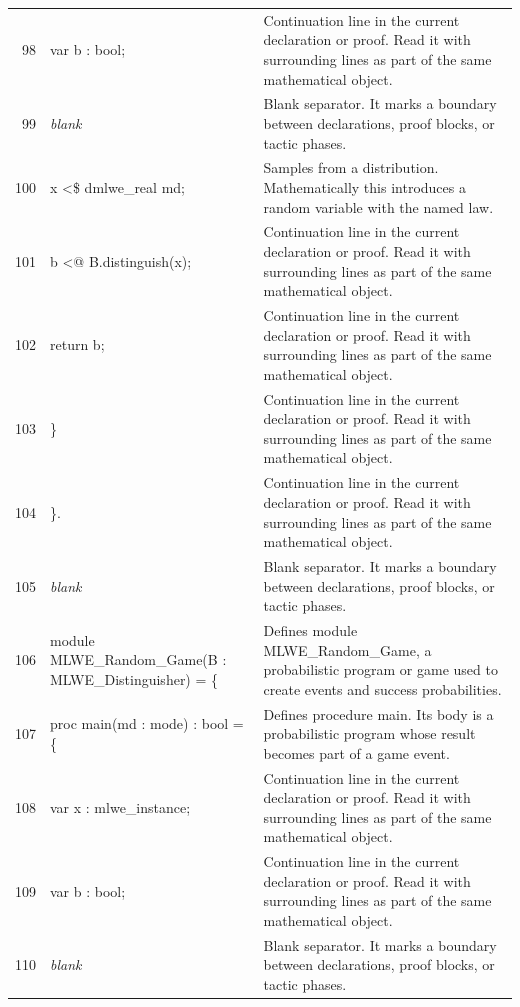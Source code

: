 \documentclass[10pt]{article}
\begin{document}
\begin{longtable}{r L{0.53\textwidth} L{0.37\textwidth}}
98 & {\ttfamily\scriptsize     var b : bool;} & Continuation line in the current declaration or proof.  Read it with surrounding lines as part of the same mathematical object. \\
99 & {\ttfamily\scriptsize \emph{blank}} & Blank separator.  It marks a boundary between declarations, proof blocks, or tactic phases. \\
100 & {\ttfamily\scriptsize     x <\$ dmlwe\_real md;} & Samples from a distribution.  Mathematically this introduces a random variable with the named law. \\
101 & {\ttfamily\scriptsize     b <@ B.distinguish(x);} & Continuation line in the current declaration or proof.  Read it with surrounding lines as part of the same mathematical object. \\
102 & {\ttfamily\scriptsize     return b;} & Continuation line in the current declaration or proof.  Read it with surrounding lines as part of the same mathematical object. \\
103 & {\ttfamily\scriptsize   \}} & Continuation line in the current declaration or proof.  Read it with surrounding lines as part of the same mathematical object. \\
104 & {\ttfamily\scriptsize \}.} & Continuation line in the current declaration or proof.  Read it with surrounding lines as part of the same mathematical object. \\
105 & {\ttfamily\scriptsize \emph{blank}} & Blank separator.  It marks a boundary between declarations, proof blocks, or tactic phases. \\
106 & {\ttfamily\scriptsize module MLWE\_Random\_Game(B : MLWE\_Distinguisher) = \{} & Defines module MLWE\_Random\_Game, a probabilistic program or game used to create events and success probabilities. \\
107 & {\ttfamily\scriptsize   proc main(md : mode) : bool = \{} & Defines procedure main.  Its body is a probabilistic program whose result becomes part of a game event. \\
108 & {\ttfamily\scriptsize     var x : mlwe\_instance;} & Continuation line in the current declaration or proof.  Read it with surrounding lines as part of the same mathematical object. \\
109 & {\ttfamily\scriptsize     var b : bool;} & Continuation line in the current declaration or proof.  Read it with surrounding lines as part of the same mathematical object. \\
110 & {\ttfamily\scriptsize \emph{blank}} & Blank separator.  It marks a boundary between declarations, proof blocks, or tactic phases. \\

\end{longtable}
\end{document}
